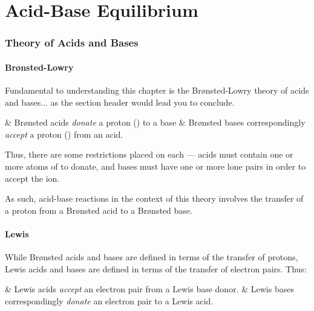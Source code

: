 

\pagebreak
\part{Acid-Base Equilibrium}

	\section{Theory of Acids and Bases}

		\subsection{Brønsted-Lowry}

			Fundamental to understanding this chapter is the Brønsted-Lowry theory of acids and bases... as the section header would lead you
			to conclude.

			\begin{bulletlist}
				& Brønsted acids \textit{donate} a proton () to a base
				& Brønsted bases correspondingly \textit{accept} a proton () from an acid.
			\end{bulletlist}

			Thus, there are some restrictions placed on each --- acids must contain one or more atoms of  to donate, and bases must have
			one or more lone pairs in order to accept the \ch{H+} ion.

			As such, acid-base reactions in the context of this theory involves the transfer of a proton from a Brønsted acid to a Brønsted base.


		\subsection{Lewis}

			While Brønsted acids and bases are defined in terms of the transfer of protons, Lewis acids and bases are defined in terms of the
			transfer of electron pairs. Thus:

			\begin{bulletlist}
				& Lewis acids \textit{accept} an electron pair from a Lewis base donor.
				& Lewis bases correspondingly \textit{donate} an electron pair to a Lewis acid.
			\end{bulletlist}

